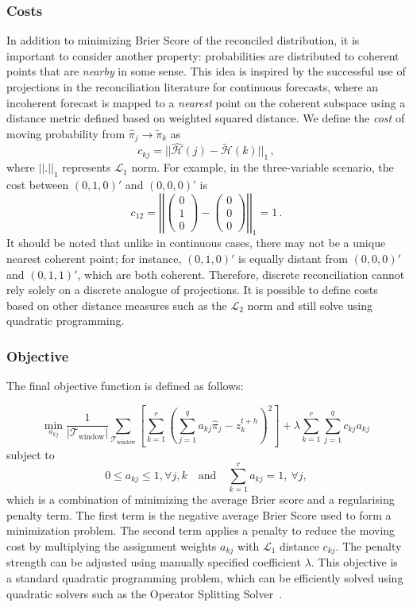 \documentclass[a4paper,review,12pt,authoryear]{elsarticle}
\theoremstyle{definition}
\begin{document}
    \subsubsection*{\textbf{Costs}}
    In addition to minimizing Brier Score of the reconciled distribution, it is important to consider another property: probabilities are distributed to coherent points that are \emph{nearby} in some sense.
    This idea is inspired by the successful use of projections in the reconciliation literature for continuous forecasts, where an incoherent forecast is mapped to  a \emph{nearest} point on the coherent subspace using a distance metric defined based on weighted squared distance.
    We define the \emph{cost} of moving probability from $\hat{\pi}_j\rightarrow\tilde{\pi}_k$ as
    \[
    c_{kj}=||\hat{\mathcal{H}}(j)-\tilde{\mathcal{H}}(k)||_1\,,
    \]
    where $||.||_1$ represents $\mathcal{L}_1$ norm. For example, in the three-variable scenario, the cost between $(0, 1, 0)'$ and $(0, 0, 0)$' is
    \[
    c_{12}=\left|\left|\begin{pmatrix}0\\1\\0\end{pmatrix}-\begin{pmatrix}0\\0\\0\end{pmatrix}\right|\right|_1=1\,.
    \]
    It should be noted that unlike in continuous cases, there may not be a unique nearest coherent point; for instance, $(0,1,0)'$ is equally distant from $(0,0,0)'$ and $(0,1,1)'$, which are both coherent.
    Therefore, discrete reconciliation cannot rely solely on a discrete analogue of projections. It is possible to define costs based on other distance measures such as the $\mathcal{L}_2$ norm and still solve using quadratic programming.


    \subsubsection*{\textbf{Objective}}

    The final objective function is defined as follows:

    \[
    \underset{a_{kj}}{\min} \frac{1}{|\mathcal{T}_{\textrm{window}}|}\sum\limits_{\mathcal{T}_{\textrm{window}}}\left[\sum\limits_{k=1}^r\left(\sum\limits_{j=1}^q a_{kj}\hat{{\pi}}_j-z^{t+h}_k\right)^2\right] + \lambda\sum\limits_{k=1}^r\sum\limits_{j=1}^q c_{kj}a_{kj}\,
    \]
    subject to
    \[
    0\leq a_{kj}\leq 1,\forall j, k \quad \text{and} \quad
    \sum\limits_{k=1}^r a_{kj} = 1,~\forall j,
    \]
    which is a combination of minimizing the average Brier score and a regularising penalty term.
    The first term is the negative average Brier Score used to form a minimization problem. The second term applies a penalty to reduce the moving cost by multiplying the assignment weights $a_{kj}$ with $\mathcal{L}_1$ distance $c_{kj}$.
    The penalty strength can be adjusted using manually specified coefficient $\lambda$.
    This objective is a standard quadratic programming problem, which can be efficiently solved using quadratic solvers such as the Operator Splitting Solver~\citep[OSQP,][]{stellatoOSQPOperatorSplitting2020}.
\end{document}
